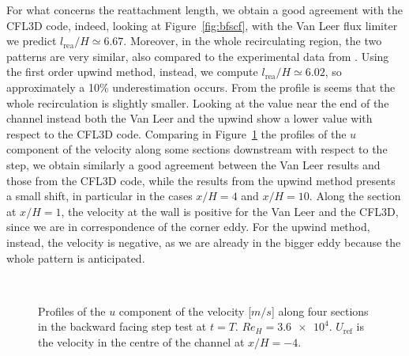 For what concerns the reattachment length, we obtain a good agreement with the CFL3D code, indeed, looking at Figure~\ref{fig:bfscf}, with the Van Leer flux limiter we predict $l_\text{rea} /H \simeq 6.67$. Moreover, in the whole recirculating region, the two patterns are very similar, also compared to the experimental data from \cite{bfs:driver}. Using the first order upwind method, instead, we compute $l_\text{rea} /H \simeq 6.02$, so approximately a 10\% underestimation occurs. From the profile is seems that the whole recirculation is slightly smaller. Looking at the value near the end of the channel instead both the Van Leer and the upwind show a lower value with respect to the CFL3D code. Comparing in Figure~\ref{fig:bfscomp} the profiles of the $u$ component of the velocity along some sections downstream with respect to the step, we obtain similarly a good agreement between the Van Leer results and those from the CFL3D code, while the results from the upwind method presents a small shift, in particular in the cases $x/H=4$ and $x/H=10$. Along the section at $x/H=1$, the velocity at the wall is positive for the Van Leer and the CFL3D, since we are in correspondence of the corner eddy. For the upwind method, instead, the velocity is negative, as we are already in the bigger eddy because the whole pattern is anticipated.
\begin{figure}
	\centering
	\subfloat[$x/H=-4$]{}
	\subfloat[$x/H=1$]{}\\
	\subfloat[$x/H=4$]{}
	\subfloat[$x/H=10$]{}
	\caption[Velocity profiles in the backward facing step test]{Profiles of the $u$ component of the velocity [$\si{m/s}$] along four sections in the backward facing step test at $t=T$. $Re_H=\num{3.6e4}$. $U_\text{ref}$ is the velocity in the centre of the channel at $x/H=-4$.}
	\label{fig:bfscomp}
\end{figure}
